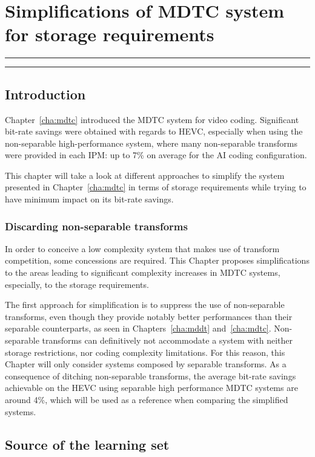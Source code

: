 \documentclass[11pt,a4paper,openright,twoside]{book}
\providecommand{\chaptertoc}{
	\startcontents[chapters]
	\hrule
	\vspace{1em}
	\printcontents[chapters]{}{1}{{\sf\large\bfseries Contents}}
	\hrule
}
\numberwithin{equation}{section} %
\numberwithin{figure}{section} %
\numberwithin{table}{section} %
\begin{document}
\chapter{Simplifications of \acs{MDTC} system for storage requirements}
\label{cha:real_world_system}
\chaptertoc

\section{Introduction}
\label{sec:rw_introduction}

Chapter~\ref{cha:mdtc} introduced the \acf{MDTC} system for video coding.
Significant bit-rate savings were obtained with regards to \ac{HEVC},
especially when using the non-separable high-performance system, where many
non-separable transforms were provided in each \ac{IPM}:
up to 7\% on average for the \ac{AI} coding configuration.

This chapter will take a look at different approaches to simplify the
system presented in Chapter~\ref{cha:mdtc} in terms of storage requirements
while trying to have minimum impact on its bit-rate savings.

\subsection{Discarding non-separable transforms}
\label{sub:discarding_non_separable_transforms}

In order to conceive a low complexity system that makes use of transform
competition, some concessions are required.
This Chapter proposes simplifications to the areas leading to significant
complexity increases in \ac{MDTC} systems, especially, to the storage
requirements.

The first approach for simplification is to suppress the use of non-separable
transforms, even though they provide notably better performances than their
separable counterparts, as seen in Chapters~\ref{cha:mddt} and~\ref{cha:mdtc}.
Non-separable transforms can definitively not accommodate a system with
neither storage restrictions, nor coding complexity limitations.
For this reason, this Chapter will only consider systems composed by separable
transforms.
As a consequence of ditching non-separable transforms, the average bit-rate
savings achievable on the \ac{HEVC} using separable high performance \ac{MDTC}
systems are around 4\%, which will be used as a reference when comparing the
simplified systems.

\section{Source of the learning set}
\label{sec:rw_source_of_the_learning_set}
\end{document}
